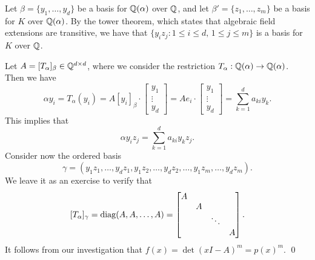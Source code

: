 \begin{pf}
    Let $\beta = \{y_1, \dots, y_d\}$ be a basis for $\mathbb{Q}(\alpha)$ over $\mathbb{Q}$, 
    and let $\beta' = \{z_1, \dots, z_m\}$ be a basis for $K$ over $\mathbb{Q}(\alpha)$.
    By the tower theorem, which states that algebraic field extensions are 
    transitive, we have that $\{y_i z_j : 1 \leq i \leq d,\, 1 \leq j \leq m\}$ 
    is a basis for $K$ over $\mathbb{Q}$. 

    Let $A = [T_\alpha]_\beta \in \mathbb{Q}^{d\times d}$, where we consider the 
    restriction $T_\alpha : \mathbb{Q}(\alpha) \to \mathbb{Q}(\alpha)$. Then we have 
    \[ \alpha y_i = T_\alpha(y_i) 
    = A[y_i]_\beta \cdot \begin{bmatrix} y_1 \\ \vdots \\ y_d \end{bmatrix} 
    = Ae_i \cdot \begin{bmatrix} y_1 \\ \vdots \\ y_d \end{bmatrix} 
    = \sum_{k=1}^d a_{ki} y_k. \]
    This implies that 
    \[ \alpha y_i z_j = \sum_{k=1}^d a_{ki} y_k z_j. \] 
    Consider now the ordered basis 
    \[ \gamma = (y_1z_1, \dots, y_dz_1, y_1z_2, \dots, y_dz_2, \dots, 
    y_1z_m, \dots, y_dz_m). \] 
    We leave it as an exercise to verify that 
    \[ [T_\alpha]_\gamma = \operatorname{diag}(A, A, \dots, A) = 
    \begin{bmatrix} A & & & \\ & A & & \\ & & \ddots & \\ & & & A \end{bmatrix}. \] 
    It follows from our investigation that $f(x) = \det(xI - A)^m = p(x)^m$. \qed
\end{pf}


